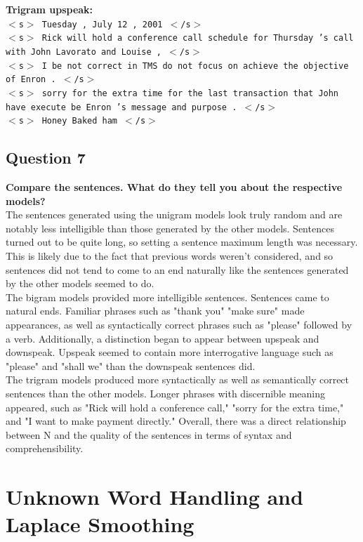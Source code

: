 \documentclass{article} %
\begin{document}
\textbf{Trigram upspeak:}\\

\texttt{$<$s$>$ Tuesday , July 12 , 2001 $<$/s$>$\\
$<$s$>$ Rick will hold a conference call schedule for Thursday 's call with John Lavorato and Louise , $<$/s$>$\\
$<$s$>$ I be not correct in TMS do not focus on achieve the objective of Enron . $<$/s$>$\\
$<$s$>$ sorry for the extra time for the last transaction that John have execute be Enron 's message and purpose . $<$/s$>$\\
$<$s$>$ Honey Baked ham $<$/s$>$}


\subsection*{Question 7}

\textbf{Compare the sentences. What do they tell you about the respective models?}
\\

The sentences generated using the unigram models look truly random and are notably less intelligible than those generated by the other models. Sentences turned out to be quite long, so setting a sentence maximum length was necessary. This is likely due to the fact that previous words weren't considered, and so sentences did not tend to come to an end naturally like the sentences generated by the other models seemed to do. \\

The bigram models provided more intelligible sentences. Sentences came to natural ends. Familiar phrases such as "thank you" "make sure" made appearances, as well as syntactically correct phrases such as "please" followed by a verb. Additionally, a distinction began to appear between upspeak and downspeak. Upspeak seemed to contain more interrogative language such as "please" and "shall we" than the downspeak sentences did.\\

The trigram models produced more syntactically as well as semantically correct sentences than the other models. Longer phrases with discernible meaning appeared, such as "Rick will hold a conference call," "sorry for the extra time," and "I want to make payment directly." Overall, there was a direct relationship between N and the quality of the sentences in terms of syntax and comprehensibility.


\section{Unknown Word Handling and Laplace Smoothing}
\end{document}
